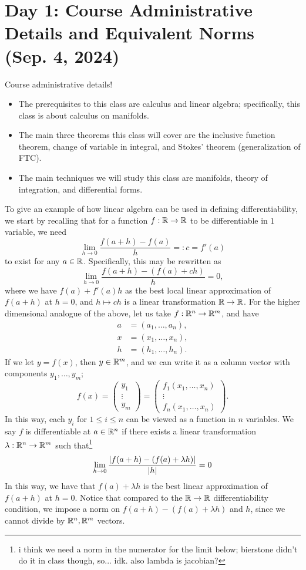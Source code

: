 \section{Day 1: Course Administrative Details and Equivalent Norms (Sep. 4, 2024)}
Course administrative details!
\begin{itemize}
    \item The prerequisites to this class are calculus and linear algebra; specifically, this class is about calculus on manifolds.
    \item The main three theorems this class will cover are the inclusive function theorem, change of variable in integral, and Stokes' theorem (generalization of FTC).
    \item The main techniques we will study this class are manifolds, theory of integration, and differential forms.
\end{itemize}
To give an example of how linear algebra can be used in defining differentiability, we start by recalling that for a function $f : \mathbb R \to \mathbb R$ to be differentiable in $1$ variable, we need
\[ \lim_{h \to 0} \frac{f(a + h) - f(a)}{h} =: c = f'(a) \]
to exist for any $a \in \mathbb R$. Specifically, this may be rewritten as
\[ \lim_{h \to 0} \frac{f(a + h) - (f(a) + ch)}{h} = 0, \]
where we have $f(a) + f'(a)h$ as the best local linear approximation of $f(a + h)$ at $h = 0$, and $h \mapsto ch$ is a linear transformation $\mathbb R \to \mathbb R$. For the higher dimensional analogue of the above, let us take $f : \mathbb R^n \to \mathbb R^m$, and have
\begin{align*}
    a &= (a_1, \dots, a_n), \\
    x &= (x_1, \dots, x_n), \\
    h &= (h_1, \dots, h_n).
\end{align*}
If we let $y = f(x)$, then $y \in \mathbb R^m$, and we can write it as a column vector with components $y_1, \dots, y_m$;
\[ f(x) = \begin{pmatrix} y_1 \\ \vdots \\ y_m \end{pmatrix} = \begin{pmatrix} f_1(x_1, \dots, x_n) \\ \vdots \\ f_n(x_1, \dots, x_n) \end{pmatrix}. \]
In this way, each $y_i$ for $1 \leq i \leq n$ can be viewed as a function in $n$ variables. We say $f$ is differentiable at $a \in \mathbb R^n$ if there exists a linear transformation $\lambda : \mathbb R^n \to \mathbb R^m$ such that\footnote{i think we need a norm in the numerator for the limit below; bierstone didn't do it in class though, so... idk. also lambda is jacobian?}
\[ \lim_{h \to 0} \frac{\left\lvert f(a + h) - (f(a) + \lambda h) \right\rvert}{\left\lvert h \right\rvert} = 0 \]
In this way, we have that $f(a) + \lambda h$ is the best linear approximation of $f(a + h)$ at $h = 0$. Notice that compared to the $\mathbb R \to \mathbb R$ differentiability condition, we impose a norm on $f(a + h) - (f(a) + \lambda h)$ and $h$, since we cannot divide by $\mathbb R^n, \mathbb R^m$ vectors.

